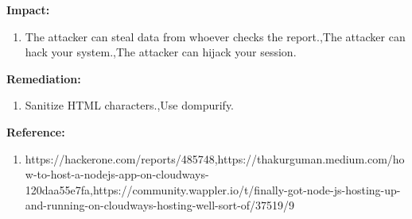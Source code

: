 \documentclass{article}
\begin{document}
\begin{description}[itemsep=2pt, leftmargin=0.2cm]
                        \item \large \textbf{Impact:}
                        \linespread{1.0}
                        \begin{enumerate}[leftmargin=0.5cm]
                        \item \large The attacker can steal data from whoever checks the report.,The attacker can hack your system.,The attacker can hijack your session. 
                        \end{enumerate}  
                
                
                        \item \large \textbf{Remediation:}
                        \linespread{1.0}
                        \begin{enumerate}[leftmargin=0.5cm]
                            
                        \item \large Sanitize HTML characters.,Use dompurify.
                        \end{enumerate}

                        \item \large \textbf{Reference:}
                        \linespread{1.0}
                        \begin{enumerate}[leftmargin=0.5cm, ]
                            
                        \item \large \underline{}{https://hackerone.com/reports/485748,https://thakurguman.medium.com/how-to-host-a-nodejs-app-on-cloudways-120daa55e7fa,https://community.wappler.io/t/finally-got-node-js-hosting-up-and-running-on-cloudways-hosting-well-sort-of/37519/9}
                        
                        \end{enumerate}


                    \end{description}
                    
                    
                    \newpage
\end{document}
